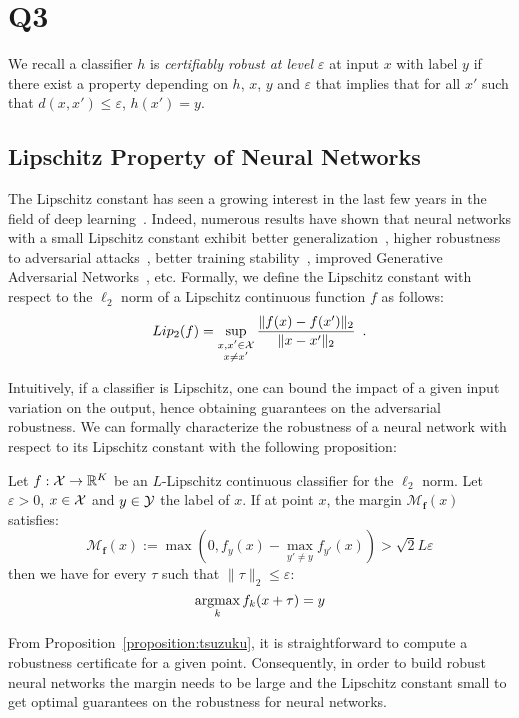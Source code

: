 \section{Q3}

We recall a classifier $h$ is \emph{certifiably robust at level $\varepsilon$} at input $x$ with label $y$ if there exist a property depending on $h$, $x$, $y$ and $\varepsilon$ that implies that for all $x'$ such that $d(x,x')\leq\varepsilon$, $h(x') = y$.




\subsection{Lipschitz Property of Neural Networks}


The Lipschitz constant has seen a growing interest in the last few years in the field of deep learning~\citep{scaman2018lipschitz,fazlyab2019efficient,combettes2020lipschitz,bethune2021many}.
Indeed, numerous results have shown that neural networks with a small Lipschitz constant exhibit better generalization~\citep{bartlett2017spectrally}, higher robustness to adversarial attacks~\citep{szegedy2014intriguing,farnia2018generalizable,tsuzuku2018lipschitz}, better training stability~\citep{xiao2018dynamical,trockman2021orthogonalizing}, improved Generative Adversarial Networks~\citep{arjovsky2017wasserstein}, etc.
Formally, we define the Lipschitz constant with respect to the $\ell_2$ norm of a Lipschitz continuous function $f$ as follows:
\begin{equation*}
  Lip_{2}{(f)} = \sup_{\substack{x, x' \in \mathcal{X} \\ x \neq x'}} \frac{\lVert f(x) - f(x') \rVert_2}{\lVert x - x' \rVert_2} \enspace.
\end{equation*}

Intuitively, if a classifier is Lipschitz, one can bound the impact of a given input variation on the output, hence obtaining guarantees on the adversarial robustness.
We can formally characterize the robustness of a neural network with respect to its Lipschitz constant with the following proposition:
\begin{prop} \label{proposition:tsuzuku}
Let $f:\mathcal{X}\to\mathbb{R}^K$ be an $L$-Lipschitz continuous classifier for the $\ell_2$ norm.
Let $\varepsilon > 0$, $x \in \mathcal{X}$ and $y \in \mathcal{Y}$ the label of $x$.
If at point $x$, the margin $\mathcal{M}_{\mathbf{f}}(x)$ satisfies:
\begin{equation*}
  \mathcal{M}_{\mathbf{f}}(x):=\max(0,f_y(x)-\max_{y'\neq y}f_{y'}(x)) > \sqrt{2} L \varepsilon
\end{equation*}
then we have for every $\tau$ such that $\lVert \tau \rVert_2 \leq \varepsilon$:
\begin{equation*}
  \operatorname*{argmax}_{k}f_k(x + \tau) = y
\end{equation*}
\end{prop}
From Proposition~\ref{proposition:tsuzuku}, it is straightforward to compute a robustness certificate for a given point.
Consequently, in order to build robust neural networks the margin needs to be large and the Lipschitz constant small to get optimal guarantees on the robustness for neural networks.

